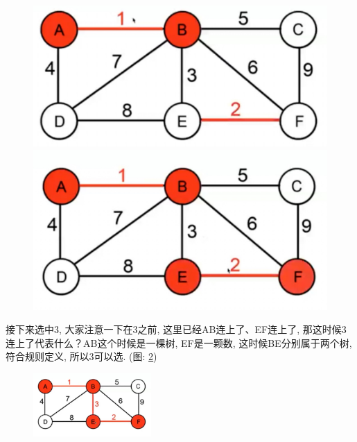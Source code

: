 \begin{figure}[ht]
  \centering
  \begin{minipage}[t]{0.4\textwidth}
    \centering
    \caption{}
    \label{fig:img27_9}
    \includegraphics[width=\textwidth]{asset/2c867981-cf42-4372-b2de-0b95d4f1729a.jpg}
  \end{minipage}%
  \hspace{1em}
  \begin{minipage}[t]{0.4\textwidth}
    \centering
    \caption{}
    \label{fig:img27_10}
    \includegraphics[width=\textwidth]{asset/c2333fd2-d4a4-4d44-8381-9d0dd9588789.jpg}
  \end{minipage}
\end{figure}

接下来选中3, 大家注意一下在3之前, 这里已经AB连上了、EF连上了, 那这时候3连上了代表什么？AB这个时候是一棵树, EF是一颗数, 这时候BE分别属于两个树, 符合规则定义, 所以3可以选. (图: \ref{fig:img27_11})

\begin{figure}[ht]
  \centering
  \caption{}
  \label{fig:img27_11}
  \includegraphics[width=0.4\textwidth]{asset/c24feadf-69a2-46d0-af7e-dae86d8956ab.jpg}
\end{figure}

